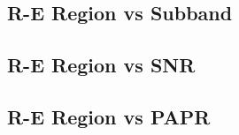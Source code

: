 

\subsection{R-E Region vs Subband}\label{sec:re-region-vs-subband}
  

\subsection{R-E Region vs SNR}\label{sec:re-region-vs-snr}
  

\subsection{R-E Region vs PAPR}\label{sec:re-region-vs-papr}
   